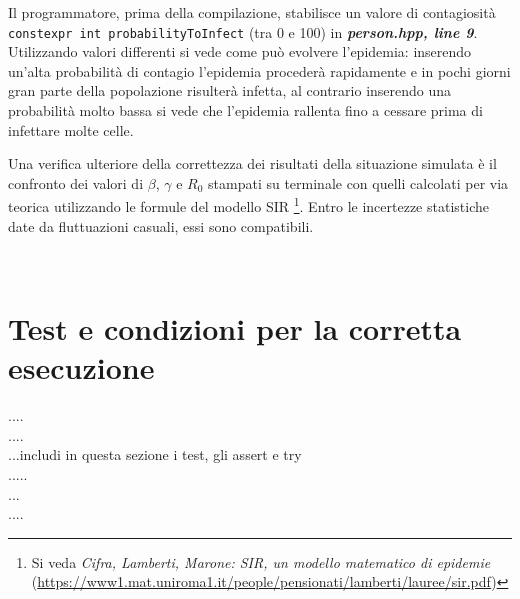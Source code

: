 \documentclass[a4paper,10 pt]{article}
\begin{document}
Il programmatore, prima della compilazione, stabilisce un valore di contagiosità \verb!constexpr int probabilityToInfect! (tra 0 e 100) in \textbf{\textit{person.hpp, line 9}}. Utilizzando valori differenti si vede come può evolvere l'epidemia: inserendo un'alta probabilità di contagio l'epidemia procederà rapidamente e in pochi giorni gran parte della popolazione risulterà infetta, al contrario inserendo una probabilità molto bassa si vede che l'epidemia rallenta fino a cessare prima di infettare molte celle.


Una verifica ulteriore della correttezza dei risultati della situazione simulata è il confronto dei valori di $\beta$, $\gamma$ e $R_0$ stampati su terminale con quelli calcolati per via teorica utilizzando le formule del modello SIR \footnote{Si veda \textit{Cifra, Lamberti, Marone: SIR, un modello matematico di epidemie} (\url{https://www1.mat.uniroma1.it/people/pensionati/lamberti/lauree/sir.pdf})}. Entro le incertezze statistiche date da fluttuazioni casuali, essi sono compatibili.

\begin{figure}[h]
\centering
{} \quad {} \\
\caption{}
\label{fig:subfig}
\end{figure}

\section{Test e condizioni per la corretta esecuzione}
....
\ \\
....
\ \\
...includi in questa sezione i test, gli assert e try 
\ \\
.....
\ \\
...
\ \\
....
\end{document}
